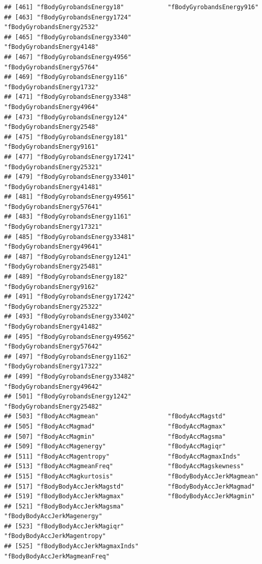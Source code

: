 \documentclass[
]{article}
\begin{document}
\begin{verbatim}
## [461] "fBodyGyrobandsEnergy18"            "fBodyGyrobandsEnergy916"          
## [463] "fBodyGyrobandsEnergy1724"          "fBodyGyrobandsEnergy2532"         
## [465] "fBodyGyrobandsEnergy3340"          "fBodyGyrobandsEnergy4148"         
## [467] "fBodyGyrobandsEnergy4956"          "fBodyGyrobandsEnergy5764"         
## [469] "fBodyGyrobandsEnergy116"           "fBodyGyrobandsEnergy1732"         
## [471] "fBodyGyrobandsEnergy3348"          "fBodyGyrobandsEnergy4964"         
## [473] "fBodyGyrobandsEnergy124"           "fBodyGyrobandsEnergy2548"         
## [475] "fBodyGyrobandsEnergy181"           "fBodyGyrobandsEnergy9161"         
## [477] "fBodyGyrobandsEnergy17241"         "fBodyGyrobandsEnergy25321"        
## [479] "fBodyGyrobandsEnergy33401"         "fBodyGyrobandsEnergy41481"        
## [481] "fBodyGyrobandsEnergy49561"         "fBodyGyrobandsEnergy57641"        
## [483] "fBodyGyrobandsEnergy1161"          "fBodyGyrobandsEnergy17321"        
## [485] "fBodyGyrobandsEnergy33481"         "fBodyGyrobandsEnergy49641"        
## [487] "fBodyGyrobandsEnergy1241"          "fBodyGyrobandsEnergy25481"        
## [489] "fBodyGyrobandsEnergy182"           "fBodyGyrobandsEnergy9162"         
## [491] "fBodyGyrobandsEnergy17242"         "fBodyGyrobandsEnergy25322"        
## [493] "fBodyGyrobandsEnergy33402"         "fBodyGyrobandsEnergy41482"        
## [495] "fBodyGyrobandsEnergy49562"         "fBodyGyrobandsEnergy57642"        
## [497] "fBodyGyrobandsEnergy1162"          "fBodyGyrobandsEnergy17322"        
## [499] "fBodyGyrobandsEnergy33482"         "fBodyGyrobandsEnergy49642"        
## [501] "fBodyGyrobandsEnergy1242"          "fBodyGyrobandsEnergy25482"        
## [503] "fBodyAccMagmean"                   "fBodyAccMagstd"                   
## [505] "fBodyAccMagmad"                    "fBodyAccMagmax"                   
## [507] "fBodyAccMagmin"                    "fBodyAccMagsma"                   
## [509] "fBodyAccMagenergy"                 "fBodyAccMagiqr"                   
## [511] "fBodyAccMagentropy"                "fBodyAccMagmaxInds"               
## [513] "fBodyAccMagmeanFreq"               "fBodyAccMagskewness"              
## [515] "fBodyAccMagkurtosis"               "fBodyBodyAccJerkMagmean"          
## [517] "fBodyBodyAccJerkMagstd"            "fBodyBodyAccJerkMagmad"           
## [519] "fBodyBodyAccJerkMagmax"            "fBodyBodyAccJerkMagmin"           
## [521] "fBodyBodyAccJerkMagsma"            "fBodyBodyAccJerkMagenergy"        
## [523] "fBodyBodyAccJerkMagiqr"            "fBodyBodyAccJerkMagentropy"       
## [525] "fBodyBodyAccJerkMagmaxInds"        "fBodyBodyAccJerkMagmeanFreq"      

\end{verbatim}
\end{document}
